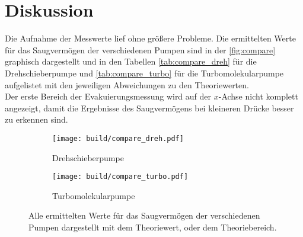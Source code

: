 \section{Diskussion}
\label{sec:Diskussion}

\noindent Die Aufnahme der Messwerte lief ohne größere Probleme. Die ermittelten Werte für das Saugvermögen der verschiedenen Pumpen sind in der \autoref{fig:compare} 
graphisch dargestellt und in den Tabellen \ref{tab:compare_dreh} für die Drehschieberpumpe und \ref{tab:compare_turbo} für die Turbomolekularpumpe
aufgelistet mit den jeweiligen Abweichungen zu den Theoriewerten.\\
Der erste Bereich der Evakuierungsmessung wird auf der $x$-Achse nicht komplett angezeigt, damit die Ergebnisse des Saugvermögens bei kleineren 
Drücke besser zu erkennen sind.

\begin{figure}[h]
    \begin{subfigure}{0.48\textwidth}
        \centering
        \texttt{[image: build/compare\_dreh.pdf]}
        \caption{Drehschieberpumpe}
        \label{fig:saug_dreh}
    \end{subfigure}
    \hfill 
    \begin{subfigure}{0.48\textwidth}
        \centering
        \texttt{[image: build/compare\_turbo.pdf]}
        \caption{Turbomolekularpumpe}
        \label{fig:saug_turbo}
    \end{subfigure}
    \caption{Alle ermittelten Werte für das Saugvermögen der verschiedenen Pumpen dargestellt mit dem Theoriewert, oder dem Theoriebereich.}
    \label{fig:compare}
\end{figure}

